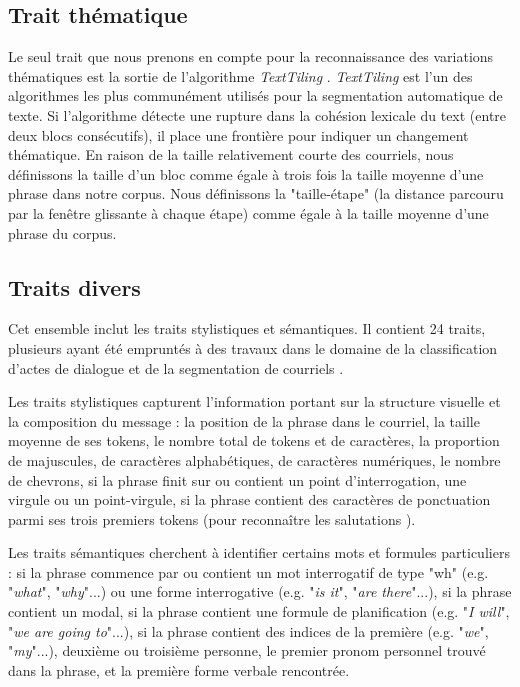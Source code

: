 \subsection{Trait thématique}

Le seul trait que nous prenons en compte pour la reconnaissance des variations thématiques est la sortie de l'algorithme \textit{TextTiling} \cite{hearst1997texttiling}. \textit{TextTiling} est l'un des algorithmes les plus communément utilisés pour la segmentation automatique de texte. Si l'algorithme détecte une rupture dans la cohésion lexicale du text (entre deux blocs consécutifs), il place une frontière pour indiquer un changement thématique. En raison de la taille relativement courte des courriels, nous définissons la taille d'un bloc comme égale à trois fois la taille moyenne d'une phrase dans notre corpus. Nous définissons la "taille-étape" (la distance parcouru par la fenêtre glissante à chaque étape) comme égale à la taille moyenne d'une phrase du corpus.

\subsection{Traits divers}

Cet ensemble inclut les traits stylistiques et sémantiques. Il contient 24 traits, plusieurs ayant été empruntés à des travaux dans le domaine de la classification d'actes de dialogue \cite{qadir2011classifying} et de la segmentation de courriels \cite{lampert2009segmenting}. 

Les traits stylistiques capturent l'information portant sur la structure visuelle et la composition du message : la position de la phrase dans le courriel, la taille moyenne de ses tokens, le nombre total de tokens et de caractères, la proportion de majuscules, de caractères alphabétiques, de caractères numériques, le nombre de chevrons, si la phrase finit sur ou contient un point d'interrogation, une virgule ou un point-virgule, si la phrase contient des caractères de ponctuation parmi ses trois premiers tokens (pour reconnaître les salutations \cite{qadir2011classifying}).

Les traits sémantiques cherchent à identifier certains mots et formules particuliers : si la phrase commence par ou contient un mot interrogatif de type "wh" (e.g. "\textit{what}", "\textit{why}"...) ou une forme interrogative (e.g. "\textit{is it}", "\textit{are there}"...), si la phrase contient un modal, si la phrase contient une formule de planification (e.g. "\textit{I will}", "\textit{we are going to}"...), si la phrase contient des indices de la première (e.g. "\textit{we}", "\textit{my}"...), deuxième ou troisième personne, le premier pronom personnel trouvé dans la phrase, et la première forme verbale rencontrée.